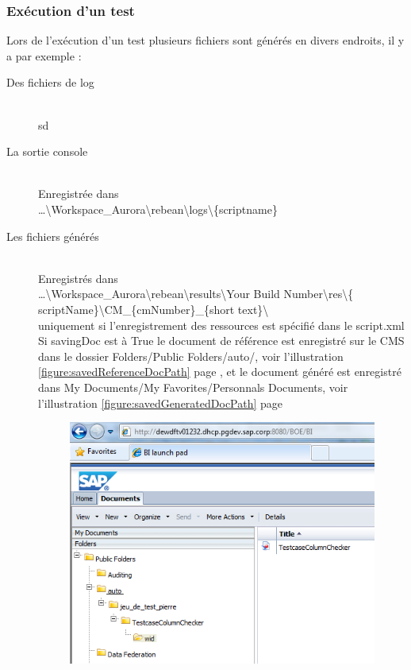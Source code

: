 \subsubsection{Exécution d'un test}


Lors de l'exécution d'un test plusieurs fichiers sont générés en divers endroits, il y a par exemple :
\begin{description}
\item[Des fichiers de log] \hfill \\ sd
\item[La sortie console] \hfill \\
Enregistrée dans \\ \ldots\textbackslash{}Workspace\_Aurora\textbackslash{}rebean\textbackslash{}logs\textbackslash{}\{scriptname\}
\item[Les fichiers générés] \hfill \\
Enregistrés dans \\ \ldots\textbackslash{}Workspace\_Aurora\textbackslash{}rebean\textbackslash{}results\textbackslash{}Your Build Number\textbackslash{}res\textbackslash{}\{ scriptName\}\textbackslash{}CM\_\{cmNumber\}\_\{short text\}\textbackslash{}\\
uniquement si l'enregistrement des ressources est spécifié dans le script.xml\\
Si savingDoc est à True le document de référence est enregistré sur le CMS dans le dossier Folders/Public Folders/auto/, voir l'illustration \ref{figure:savedReferenceDocPath} page \pageref{figure:savedReferenceDocPath}, et le document généré est enregistré dans My Documents/My Favorites/Personnals Documents, voir l'illustration \ref{figure:savedGeneratedDocPath} page \pageref{figure:savedGeneratedDocPath}
\begin{figure}[!h]
  \centering
      \includegraphics{images/savedReferenceDocPath.png}

\end{figure}
\end{description}
